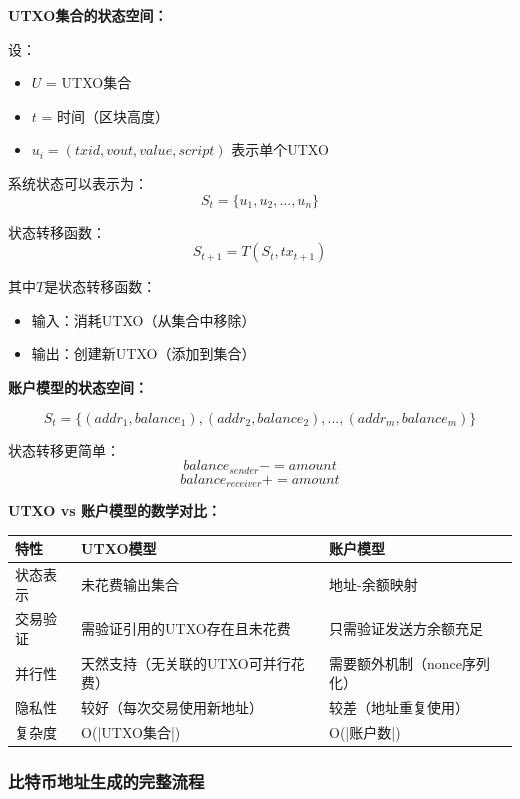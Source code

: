 ﻿\documentclass[12pt,a4paper]{article}
\begin{document}
\begin{theorybox}
\textbf{UTXO集合的状态空间：}

设：
\begin{itemize}[leftmargin=1.5em]
\item $U$ = UTXO集合
\item $t$ = 时间（区块高度）
\item $u_i = (txid, vout, value, script)$ 表示单个UTXO
\end{itemize}

系统状态可以表示为：
$$S_t = \{u_1, u_2, ..., u_n\}$$

状态转移函数：
$$S_{t+1} = T(S_t, tx_{t+1})$$

其中$T$是状态转移函数：
\begin{itemize}[leftmargin=1.5em]
\item 输入：消耗UTXO（从集合中移除）
\item 输出：创建新UTXO（添加到集合）
\end{itemize}

\textbf{账户模型的状态空间：}

$$S_t = \{(addr_1, balance_1), (addr_2, balance_2), ..., (addr_m, balance_m)\}$$

状态转移更简单：
$$balance_{sender} -= amount$$
$$balance_{receiver} += amount$$
\end{theorybox}

\textbf{UTXO vs 账户模型的数学对比：}

\begin{center}
\begin{tabular}{|l|p{5cm}|p{5cm}|}
\hline
\rowcolor{LightBG}
\textbf{特性} & \textbf{UTXO模型} & \textbf{账户模型} \\
\hline
状态表示 & 未花费输出集合 & 地址-余额映射 \\
\hline
交易验证 & 需验证引用的UTXO存在且未花费 & 只需验证发送方余额充足 \\
\hline
并行性 & 天然支持（无关联的UTXO可并行花费） & 需要额外机制（nonce序列化） \\
\hline
隐私性 & 较好（每次交易使用新地址） & 较差（地址重复使用） \\
\hline
复杂度 & O(|UTXO集合|) & O(|账户数|) \\
\hline
\end{tabular}
\end{center}

\subsubsection{比特币地址生成的完整流程}
\end{document}
